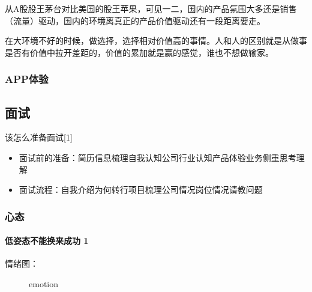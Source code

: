 \documentclass[letterpaper,11pt,english]{sphinxmanual}
\begin{document}
从A股股王茅台对比美国的股王苹果，可见一二，国内的产品氛围大多还是销售（流量）驱动，国内的环境离真正的产品价值驱动还有一段距离要走。

在大环境不好的时候，做选择，选择相对价值高的事情。人和人的区别就是从做事是否有价值中拉开差距的，价值的累加就是赢的感觉，谁也不想做输家。


\subsubsection{APP体验}
\label{\detokenize{chapter_project/APP_experience:app}}\label{\detokenize{chapter_project/APP_experience::doc}}

\subsection{面试}
\label{\detokenize{chapter_interview/index:chap-interview}}\label{\detokenize{chapter_interview/index:id1}}\label{\detokenize{chapter_interview/index::doc}}
该怎么准备面试{[}1{]}
\begin{itemize}
\item {} 
面试前的准备：简历信息梳理\sphinxhyphen{}自我认知\sphinxhyphen{}公司行业认知\sphinxhyphen{}产品体验\sphinxhyphen{}业务侧重思考理解

\item {} 
面试流程：自我介绍\sphinxhyphen{}为何转行\sphinxhyphen{}项目梳理\sphinxhyphen{}公司情况\sphinxhyphen{}岗位情况\sphinxhyphen{}请教问题

\end{itemize}


\subsubsection{心态}
\label{\detokenize{chapter_interview/xintai:id1}}\label{\detokenize{chapter_interview/xintai::doc}}

\paragraph{低姿态不能换来成功 1\sphinxfootnotemark[751]}
\label{\detokenize{chapter_interview/xintai:id2}}%
\begin{footnotetext}[751]\sphinxAtStartFootnote
{}
%
\end{footnotetext}\ignorespaces 
情绪图：

\begin{figure}[H]
\centering
\capstart

\noindent{}
\caption{emotion}\label{\detokenize{chapter_interview/xintai:id10}}\end{figure}
\end{document}
